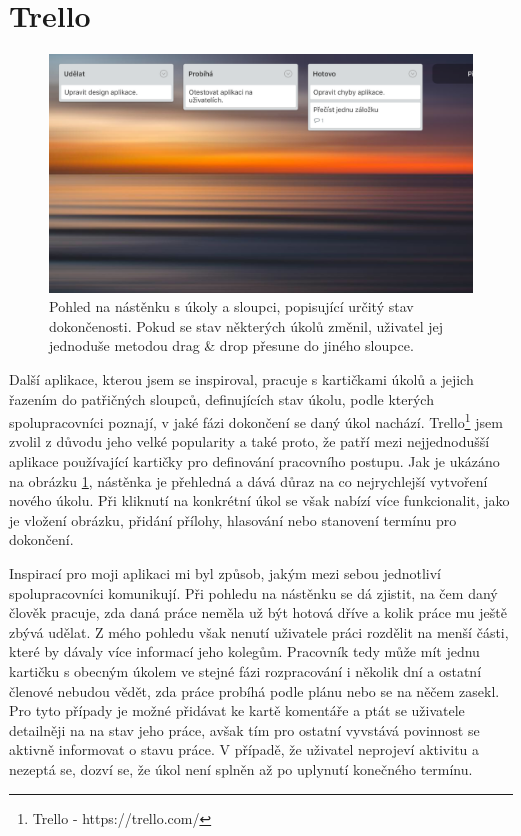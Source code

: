 \section{Trello}

\begin{figure}[H]
\centering
\includegraphics[width= 12cm]{obrazky-figures/IMG_0338}
\caption{Pohled na nástěnku s úkoly a sloupci, popisující určitý stav dokončenosti. Pokud se stav některých úkolů změnil, uživatel jej jednoduše metodou drag \& drop přesune do jiného sloupce.}
\label{trello}
\end{figure}

Další aplikace, kterou jsem se inspiroval, pracuje s kartičkami úkolů a jejich řazením do patřičných sloupců, definujících stav úkolu, podle kterých spolupracovníci poznají, v jaké fázi dokončení se daný úkol nachází. Trello\footnote{Trello - https://trello.com/} jsem zvolil z důvodu jeho velké popularity a také proto, že patří mezi nejjednodušší aplikace používající kartičky pro definování pracovního postupu. Jak je ukázáno na obrázku \ref{trello}, nástěnka je přehledná a dává důraz na co nejrychlejší vytvoření nového úkolu. Při kliknutí na konkrétní úkol se však nabízí více funkcionalit, jako je vložení obrázku, přidání přílohy, hlasování nebo stanovení termínu pro dokončení. 

Inspirací pro moji aplikaci mi byl způsob, jakým mezi sebou jednotliví spolupracovníci komunikují. Při pohledu na nástěnku se dá zjistit, na čem daný člověk pracuje, zda daná práce neměla už být hotová dříve a kolik práce mu ještě zbývá udělat. Z mého pohledu však nenutí uživatele práci rozdělit na menší části, které by dávaly více informací jeho kolegům. Pracovník tedy může mít jednu kartičku s obecným úkolem ve stejné fázi rozpracování i několik dní a ostatní členové nebudou vědět, zda práce probíhá podle plánu nebo se na něčem zasekl. Pro tyto případy je možné přidávat ke kartě komentáře a ptát se uživatele detailněji na na stav jeho práce, avšak tím pro ostatní vyvstává povinnost se aktivně informovat o stavu práce. V případě, že uživatel neprojeví aktivitu a nezeptá se, dozví se, že úkol není splněn až po uplynutí konečného termínu.

